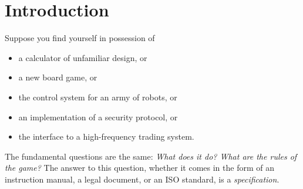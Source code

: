 \chapter{Introduction}
\label{chapter-introduction}






Suppose you find yourself in possession of
\smallskip
\begin{itemize}
\item a calculator of unfamiliar design, or 
\item a new board game, or
\item the control system for an army of robots, or
\item an implementation of a security protocol, or
\item the interface to a high-frequency trading system.
\end{itemize}
\smallskip The fundamental questions are the same: {\it What does it
  do? What are the rules of the game?} The answer to this question,
whether it comes in the form of an instruction manual, a legal
document, or an ISO standard, is a {\it specification}.


